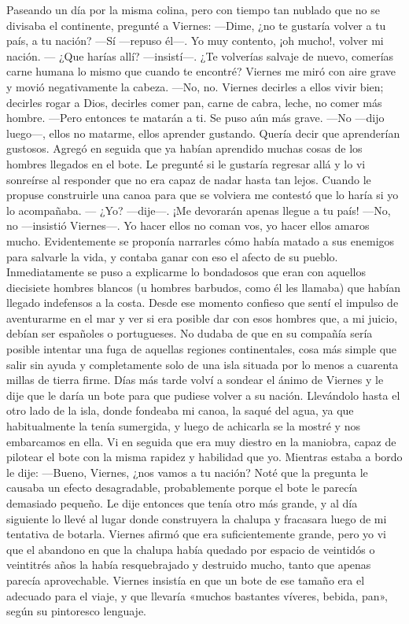 \documentclass{novela}
\begin{document}
    Paseando un día por la misma colina, pero con tiempo tan nublado que no se divisaba el continente, pregunté a Viernes:
    —Dime, ¿no te gustaría volver a tu país, a tu nación?
    —Sí —repuso él—. Yo muy contento, ¡oh mucho!, volver mi nación.
    — ¿Que harías allí? —insistí—. ¿Te volverías salvaje de nuevo, comerías carne humana lo mismo que cuando te encontré?
    Viernes me miró con aire grave y movió negativamente la cabeza.
    —No, no. Viernes decirles a ellos vivir bien; decirles rogar a Dios, decirles comer pan, carne de cabra, leche, no comer más hombre.
    —Pero entonces te matarán a ti.
    Se puso aún más grave.
    —No —dijo luego—, ellos no matarme, ellos aprender gustando.
    Quería decir que aprenderían gustosos. Agregó en seguida que ya habían aprendido muchas cosas de los hombres llegados en el bote. Le pregunté si le gustaría regresar allá y lo vi sonreírse al responder que no era capaz de nadar hasta tan lejos. Cuando le propuse construirle una canoa para que se volviera me contestó que lo haría si yo lo acompañaba.
    — ¿Yo? —dije—. ¡Me devorarán apenas llegue a tu país!
    —No, no —insistió Viernes—. Yo hacer ellos no coman vos, yo hacer ellos amaros mucho.
    Evidentemente se proponía narrarles cómo había matado a sus enemigos para salvarle la vida, y contaba ganar con eso el afecto de su pueblo. Inmediatamente se puso a explicarme lo bondadosos que eran con aquellos diecisiete hombres blancos (u hombres barbudos, como él les llamaba) que habían llegado indefensos a la costa.
    Desde ese momento confieso que sentí el impulso de aventurarme en el mar y ver si era posible dar con esos hombres que, a mi juicio, debían ser españoles o portugueses. No dudaba de que en su compañía sería posible intentar una fuga de aquellas regiones continentales, cosa más simple que salir sin ayuda y completamente solo de una isla situada por lo menos a cuarenta millas de tierra firme. Días más tarde volví a sondear el ánimo de Viernes y le dije que le daría un bote para que pudiese volver a su nación. Llevándolo hasta el otro lado de la isla, donde fondeaba mi canoa, la saqué del agua, ya que habitualmente la tenía sumergida, y luego de achicarla se la mostré y nos embarcamos en ella.
    Vi en seguida que era muy diestro en la maniobra, capaz de pilotear el bote con la misma rapidez y habilidad que yo. Mientras estaba a bordo le dije:
    —Bueno, Viernes, ¿nos vamos a tu nación?
    Noté que la pregunta le causaba un efecto desagradable, probablemente porque el bote le parecía demasiado pequeño. Le dije entonces que tenía otro más grande, y al día siguiente lo llevé al lugar donde construyera la chalupa y fracasara luego de mi tentativa de botarla. Viernes afirmó que era suficientemente grande, pero yo vi que el abandono en que la chalupa había quedado por espacio de veintidós o veintitrés años la había resquebrajado y destruido mucho, tanto que apenas parecía aprovechable. Viernes insistía en que un bote de ese tamaño era el adecuado para el viaje, y que llevaría «muchos bastantes víveres, bebida, pan», según su pintoresco lenguaje.
\end{document}
